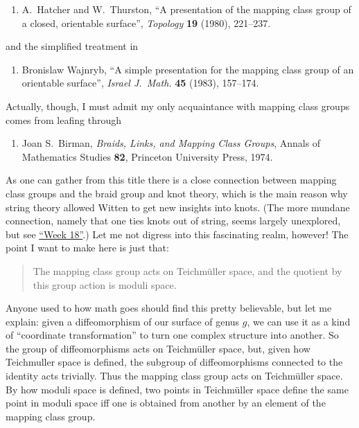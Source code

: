 \documentclass[12pt]{article}
\def\tightlist{}
\begin{document}
\begin{enumerate}
\def\labelenumi{\arabic{enumi})}
\setcounter{enumi}{4}
\tightlist
\item
  A.\ Hatcher and W.\ Thurston, ``A presentation of the mapping class group of a closed, orientable
  surface'', \emph{Topology} \textbf{19}
  (1980), 221--237.
\end{enumerate}
\noindent
and the simplified treatment in

\begin{enumerate}
\def\labelenumi{\arabic{enumi})}
\setcounter{enumi}{5}
\tightlist
\item
  Bronislaw Wajnryb, ``A simple presentation for the mapping class group of an orientable
  surface'', \emph{Israel J.\ Math.} \textbf{45} (1983), 157--174.
\end{enumerate}
\noindent
Actually, though, I must admit my only acquaintance with mapping class
groups comes from leafing through

\begin{enumerate}
\def\labelenumi{\arabic{enumi})}
\setcounter{enumi}{6}
\tightlist
\item
  Joan S.\ Birman, \emph{Braids, Links, and Mapping Class Groups},
  Annals of Mathematics Studies \textbf{82}, Princeton
  University Press, 1974.
\end{enumerate}

As one can gather from this title there is a close connection between
mapping class groups and the braid group and knot theory, which is the
main reason why string theory allowed Witten to get new insights into
knots. (The more mundane connection, namely that one ties knots out of
string, seems largely unexplored, but see
\protect\hyperlink{week18}{``Week 18''}.) Let me not digress into this
fascinating realm, however! The point I want to make here is just that:

\begin{quote}
The mapping class group acts on Teichm\"uller space, and the quotient by
this group action is moduli space.
\end{quote}

Anyone used to how math goes should find this pretty believable, but let
me explain: given a diffeomorphism of our surface of genus \(g\), we can use
it as a kind of ``coordinate transformation'' to turn one complex
structure into another. So the group of diffeomorphisms acts on
Teichm\"uller space, but, given how Teichmuller space is defined, the
subgroup of diffeomorphisms connected to the identity acts trivially.
Thus the mapping class group acts on Teichm\"uller space. By how moduli
space is defined, two points in Teichm\"uller space define the same point
in moduli space iff one is obtained from another by an element of the
mapping class group.
\end{document}
